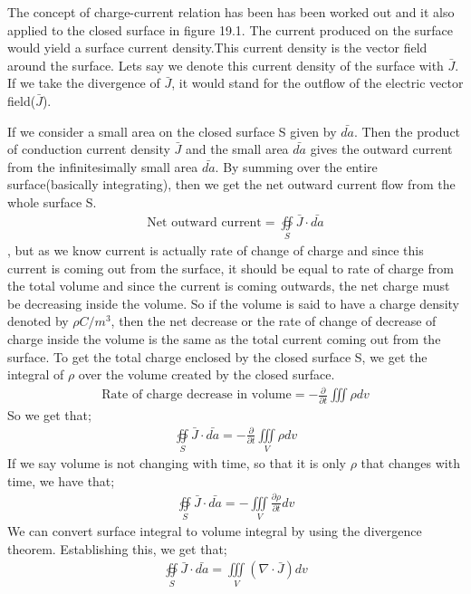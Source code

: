 The concept of charge-current relation has been has been worked out and it also applied to the closed surface in figure 19.1. The current produced on the surface would yield a surface current density.This current density is the vector field around the surface. Lets say we denote this current density of the surface with $\bar{J}$. If we take the divergence of $\bar{J}$, it would stand for the outflow of the electric vector field($\bar{J}$).

If we consider a small area on the closed surface S given by $\bar{da}$. Then the product of conduction current density $\bar{J}$ and the small area  $\bar{da}$ gives the outward current from the infinitesimally small area  $\bar{da}$. By summing over the entire surface(basically integrating), then we get the net outward current flow from the whole surface S.
\begin{align*}
\text{Net outward current}= \oiint\limits_S\bar{J}\cdot\bar{da}
\end{align*},
but as we know current is actually rate of change of charge and since this current is coming out from the surface, it should be equal to rate of charge from the total volume and since the current is coming outwards, the net charge must be decreasing inside the volume. So if the volume is said to have a charge density denoted by $\rho C/m^{3}$, then the net decrease or the rate of change of decrease of charge inside the volume is the same as the total current coming out from the surface.  To get the total charge enclosed by the closed surface S, we get the integral of $\rho$ over the volume created by the closed surface.
\begin{align*}
\text{Rate of charge decrease in volume}	= -\frac{\partial}{\partial t}\iiint \rho dv
\end{align*}
So we get that;
\begin{align*}
\oiint\limits_S\bar{J}\cdot\bar{da} =  -\frac{\partial}{\partial t}\iiint\limits_V\rho dv
\end{align*}
If we say volume is not changing with time, so that it is only $\rho$ that  changes with time, we have that;
\begin{align*}
\oiint\limits_S\bar{J}\cdot\bar{da} = -\iiint\limits_V\frac{\partial\rho}{\partial t}dv
\end{align*}
We can convert surface integral to volume integral by using the divergence theorem. Establishing this, we get that;
\begin{align*}
\oiint\limits_S\bar{J}\cdot\bar{da} = \iiint\limits_V(\nabla\cdot\bar{J})dv
\end{align*}
